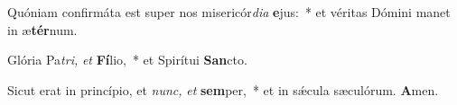 \item Quóniam confirmáta est super nos misericór\textit{di}\textit{a} \textbf{e}jus:~* et véritas Dómini manet in æ\textbf{tér}num.
\item Glória Pa\tinyhspace\textit{tri,} \textit{et} \textbf{Fí}lio,~* et Spirítui \textbf{San}cto.
\item Sicut erat in princípio, et \textit{nunc,} \textit{et} \textbf{sem}per,~* et in sǽcula sæculórum. \textbf{A}men.
